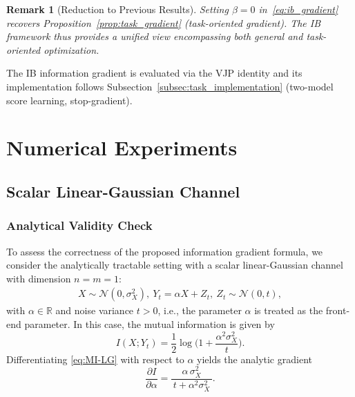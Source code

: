 \documentclass[conference]{IEEEtran}
\newtheorem{remark}{Remark}
\begin{document}
\begin{remark}[Reduction to Previous Results] \rm 
Setting $\beta = 0$ in~\eqref{eq:ib_gradient} recovers 
Proposition~\ref{prop:task_gradient} (task-oriented gradient). 
The IB framework thus provides a unified view encompassing both 
general and task-oriented optimization.
\end{remark}

The IB information gradient is evaluated via the VJP identity 
and its implementation follows Subsection~\ref{subsec:task_implementation}
(two-model score learning, stop-gradient).

\section{Numerical Experiments}
\label{sec:experiments}

\subsection{Scalar Linear-Gaussian Channel}

\subsubsection{Analytical Validity Check}
\label{subsec:linear_gaussian}
To assess the correctness of the proposed information gradient formula, 
we consider the analytically tractable setting with a scalar linear-Gaussian channel 
with dimension $n=m=1$:
\begin{align}   
X \sim \mathcal N(0,\sigma_X^2), \ 
Y_t = \alpha X+Z_t, \ 
Z_t \sim \mathcal N(0,t),
\end{align}
with $\alpha\in\mathbb R$ and noise variance $t>0$, i.e.,
the parameter $\alpha$ is treated as the front-end parameter.
In this case, the mutual information is given by
\begin{equation}
\label{eq:MI-LG}
I(X;Y_t)=\frac12\log\!\Big(1+\frac{\alpha^2\sigma_X^2}{t}\Big).
\end{equation}
Differentiating \eqref{eq:MI-LG} with respect to $\alpha$ yields the analytic gradient
\begin{equation}
\label{eq:dI-dalpha-analytic}
\frac{\partial I}{\partial \alpha}
=\frac{\alpha\,\sigma_X^2}{\,t+\alpha^2\sigma_X^2\,}.
\end{equation}
\end{document}
